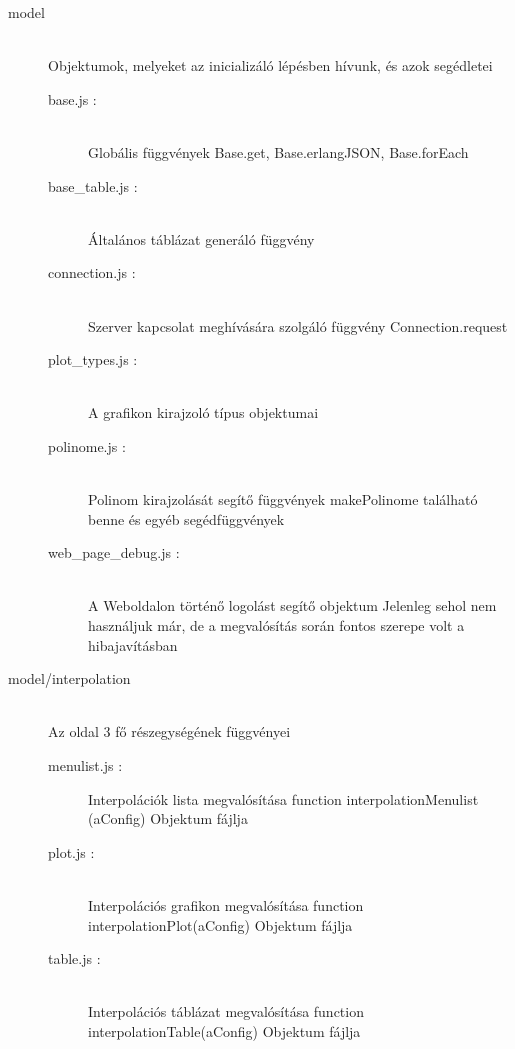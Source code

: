 \begin{description}
		\item[model] \hfill \\ 
		Objektumok, melyeket az inicializáló lépésben hívunk, és azok segédletei
		\begin{description}
		 	\item[base.js : ] \hfill \\
		 		Globális függvények \newline
		 		Base.get, Base.erlangJSON, Base.forEach
		 	\item[base\_table.js : ] \hfill \\
		 		Általános táblázat generáló függvény
		 	\item[connection.js : ] \hfill \\
		 		Szerver kapcsolat meghívására szolgáló függvény \newline
		 		Connection.request
		 	\item[plot\_types.js : ] \hfill \\
		 		A grafikon kirajzoló típus objektumai
		 	\item[polinome.js : ] \hfill \\  
		 		Polinom kirajzolását segítő függvények \newline
		 		makePolinome található benne és egyéb segédfüggvények
		 	\item[web\_page\_debug.js : ] \hfill \\ 
		 		A Weboldalon történő logolást segítő objektum \newline
		 		Jelenleg sehol nem használjuk már, de a megvalósítás során fontos szerepe volt a hibajavításban
		\end{description}
		\item[model/interpolation] \hfill \\
		Az oldal 3 fő részegységének függvényei
			\begin{description}
			\item[menulist.js : ] 
				Interpolációk lista megvalósítása \newline
				function interpolationMenulist (aConfig) Objektum fájlja
		  	\item[plot.js : ] \hfill \\ 
		  		Interpolációs grafikon megvalósítása \newline
				function interpolationPlot(aConfig) Objektum fájlja
			\item[table.js : ] \hfill \\
				Interpolációs táblázat megvalósítása \newline
				function interpolationTable(aConfig) Objektum fájlja
			\end{description}
	\end{description}
